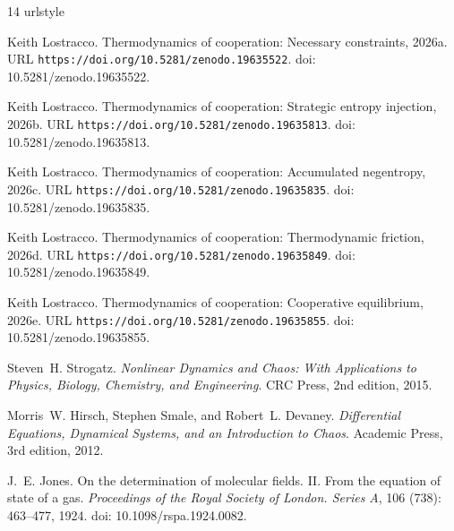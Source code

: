 \documentclass[11pt]{article}
\theoremstyle{plain}
\theoremstyle{definition}
\theoremstyle{remark}
\begin{document}
\begin{thebibliography}{14}
\providecommand{\natexlab}[1]{#1}
\providecommand{\url}[1]{\texttt{#1}}
\expandafter\ifx\csname urlstyle\endcsname\relax
  \providecommand{\doi}[1]{doi: #1}\else
  \providecommand{\doi}{doi: \begingroup \urlstyle{rm}\Url}\fi

\bibitem[Lostracco(2026{\natexlab{a}})]{TC-I}
Keith Lostracco.
\newblock Thermodynamics of cooperation: Necessary constraints,
  2026{\natexlab{a}}.
\newblock URL \url{https://doi.org/10.5281/zenodo.19635522}.
\newblock \doi{10.5281/zenodo.19635522}.

\bibitem[Lostracco(2026{\natexlab{b}})]{TC-II}
Keith Lostracco.
\newblock Thermodynamics of cooperation: Strategic entropy injection,
  2026{\natexlab{b}}.
\newblock URL \url{https://doi.org/10.5281/zenodo.19635813}.
\newblock \doi{10.5281/zenodo.19635813}.

\bibitem[Lostracco(2026{\natexlab{c}})]{TC-III}
Keith Lostracco.
\newblock Thermodynamics of cooperation: Accumulated negentropy,
  2026{\natexlab{c}}.
\newblock URL \url{https://doi.org/10.5281/zenodo.19635835}.
\newblock \doi{10.5281/zenodo.19635835}.

\bibitem[Lostracco(2026{\natexlab{d}})]{TC-IV}
Keith Lostracco.
\newblock Thermodynamics of cooperation: Thermodynamic friction,
  2026{\natexlab{d}}.
\newblock URL \url{https://doi.org/10.5281/zenodo.19635849}.
\newblock \doi{10.5281/zenodo.19635849}.

\bibitem[Lostracco(2026{\natexlab{e}})]{TC-V}
Keith Lostracco.
\newblock Thermodynamics of cooperation: Cooperative equilibrium,
  2026{\natexlab{e}}.
\newblock URL \url{https://doi.org/10.5281/zenodo.19635855}.
\newblock \doi{10.5281/zenodo.19635855}.

Steven~H. Strogatz.
\newblock \emph{Nonlinear Dynamics and Chaos: With Applications to Physics,
  Biology, Chemistry, and Engineering}.
\newblock CRC Press, 2nd edition, 2015.

Morris~W. Hirsch, Stephen Smale, and Robert~L. Devaney.
\newblock \emph{Differential Equations, Dynamical Systems, and an Introduction
  to Chaos}.
\newblock Academic Press, 3rd edition, 2012.

J.~E. Jones.
\newblock On the determination of molecular fields. {II}. {From} the equation
  of state of a gas.
\newblock \emph{Proceedings of the Royal Society of London. Series A},
  106 (738): 463--477, 1924.
\newblock \doi{10.1098/rspa.1924.0082}.


\end{thebibliography}
\end{document}

